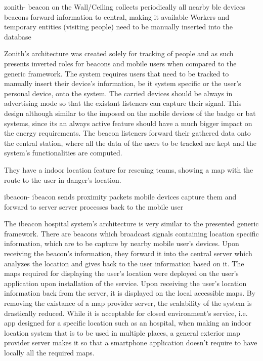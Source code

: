 zonith- 	beacon on the Wall/Ceiling collects periodically all nearby ble devices
			beacons forward information to central, making it available
			Workers and temporary entities (visiting people) need to be manually inserted into the database

Zonith's architecture was created solely for tracking of people and as such presents inverted roles for beacons and mobile users when compared to the generic framework. The system requires users that need to be tracked to manually insert their device's information, be it system specific or the user's personal device, onto the system. The carried devices should be always in advertising mode so that the existant listeners can capture their signal. This design although similar to the imposed on the mobile devices of the badge or bat systems, since its an always active feature should have a much bigger impact on the energy requirements. The beacon listeners forward their gathered data onto the central station, where all the data of the users to be tracked are kept and the system's functionalities are computed. 

They have a indoor location feature for rescuing teams, showing a map with the route to the user in danger's location. 


ibeacon- 	ibeacon sends proximity packets
			mobile devices capture them and forward to server
			server processes back to the mobile user

The ibeacon hospital system's architecture is very similar to the presented generic framework. There are beacons which broadcast signals containing location specific information, which are to be capture by nearby mobile user's devices. Upon receiving the beacon's information, they forward it into the central server which analyzes the location and gives back to the user information based on it. The maps required for displaying the user's location were deployed on the user's application upon installation of the service. Upon receiving the user's location information back from the server, it is displayed on the local accessible maps. By removing the existance of a map provider server, the scalability of the system is drastically reduced. While it is acceptable for closed environment's service, i.e. app designed for a specific location such as an hospital, when making an indoor location system that is to be used in multiple places, a general exterior map provider server makes it so that a smartphone application doesn't require to have locally all the required maps.